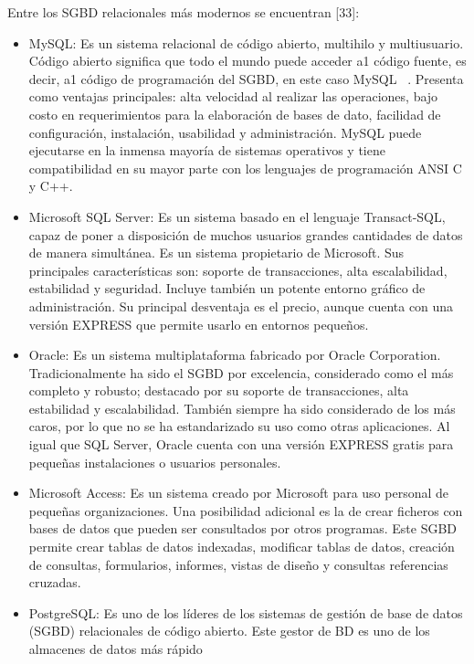\vspace{10pt}
Entre los SGBD relacionales más modernos se encuentran [33]:
\begin{itemize}
    \item MySQL: Es un sistema relacional de código abierto, multihilo y multiusuario. Código
    abierto significa que todo el mundo puede acceder a1 código fuente, es decir, a1 código de
    programación del SGBD, en este caso MySQL ~\cite{ian2003biblia}. Presenta como ventajas principales: alta
    velocidad al realizar las operaciones, bajo costo en requerimientos para la elaboración de
    bases de dato, facilidad de configuración, instalación, usabilidad y administración. MySQL
    puede ejecutarse en la inmensa mayoría de sistemas operativos y tiene compatibilidad en su
    mayor parte con los lenguajes de programación ANSI C y C++.
    \item Microsoft SQL Server: Es un sistema basado en el lenguaje Transact-SQL, capaz de poner
    a disposición de muchos usuarios grandes cantidades de datos de manera simultánea. Es un
    sistema propietario de Microsoft. Sus principales características son: soporte de
    transacciones, alta escalabilidad, estabilidad y seguridad. Incluye también un potente entorno
    gráfico de administración. Su principal desventaja es el precio, aunque cuenta con una
    versión EXPRESS que permite usarlo en entornos pequeños.
    \item Oracle: Es un sistema multiplataforma fabricado por Oracle Corporation. Tradicionalmente
    ha sido el SGBD por excelencia, considerado como el más completo y robusto; destacado
    por su soporte de transacciones, alta estabilidad y escalabilidad. También siempre ha sido
    considerado de los más caros, por lo que no se ha estandarizado su uso como otras
    aplicaciones. Al igual que SQL Server, Oracle cuenta con una versión EXPRESS gratis para
    pequeñas instalaciones o usuarios personales.
    \item Microsoft Access: Es un sistema creado por Microsoft para uso personal de pequeñas
    organizaciones. Una posibilidad adicional es la de crear ficheros con bases de datos que
    pueden ser consultados por otros programas. Este SGBD permite crear tablas de datos
    indexadas, modificar tablas de datos, creación de consultas, formularios, informes, vistas de
    diseño y consultas referencias cruzadas.
    \item PostgreSQL: Es uno de los líderes de los sistemas de gestión de base de datos (SGBD)
    relacionales de código abierto. Este gestor de BD es uno de los almacenes de datos más rápido

\end{itemize}
